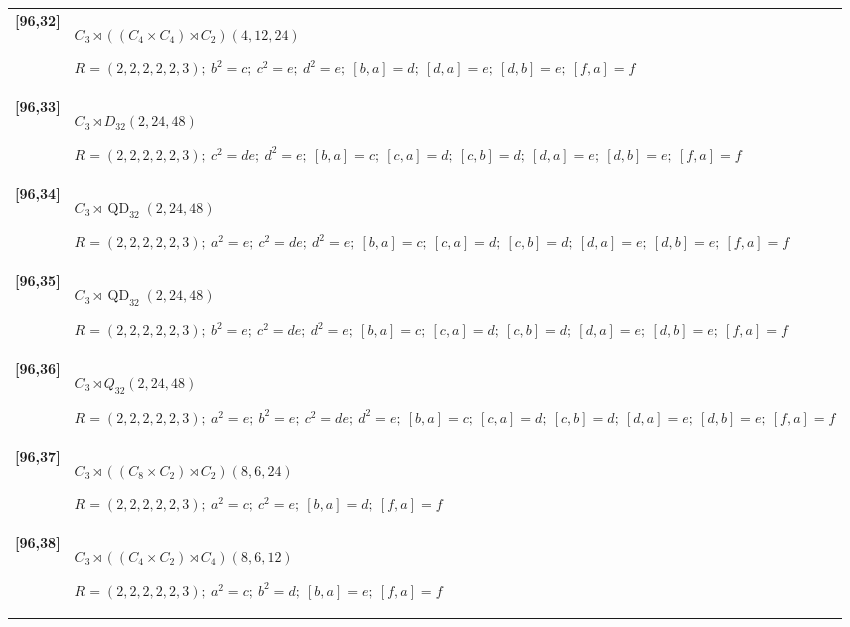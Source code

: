 \documentclass[UTF8,fontset=fandol,11pt,a4paper]{ctexart}
\begin{document}
\begin{longtable}{@{}p{17mm}>{\raggedright\arraybackslash}p{141mm}@{}}
\textbf{[96,32]} & $C_{3}\rtimes ((C_{4}\times C_{4})\rtimes C_{2})$\quad $(4,12,24)$\par\(R=(2,2,2,2,2,3);\allowbreak\ b^{2}=c;\allowbreak\ c^{2}=e;\allowbreak\ d^{2}=e;\allowbreak\ [b,a]=d;\allowbreak\ [d,a]=e;\allowbreak\ [d,b]=e;\allowbreak\ [f,a]=f\)\\[3pt]

\textbf{[96,33]} & $C_{3}\rtimes D_{32}$\quad $(2,24,48)$\par\(R=(2,2,2,2,2,3);\allowbreak\ c^{2}=de;\allowbreak\ d^{2}=e;\allowbreak\ [b,a]=c;\allowbreak\ [c,a]=d;\allowbreak\ [c,b]=d;\allowbreak\ [d,a]=e;\allowbreak\ [d,b]=e;\allowbreak\ [f,a]=f\)\\[3pt]

\textbf{[96,34]} & $C_{3}\rtimes \operatorname{QD}_{32}$\quad $(2,24,48)$\par\(R=(2,2,2,2,2,3);\allowbreak\ a^{2}=e;\allowbreak\ c^{2}=de;\allowbreak\ d^{2}=e;\allowbreak\ [b,a]=c;\allowbreak\ [c,a]=d;\allowbreak\ [c,b]=d;\allowbreak\ [d,a]=e;\allowbreak\ [d,b]=e;\allowbreak\ [f,a]=f\)\\[3pt]

\textbf{[96,35]} & $C_{3}\rtimes \operatorname{QD}_{32}$\quad $(2,24,48)$\par\(R=(2,2,2,2,2,3);\allowbreak\ b^{2}=e;\allowbreak\ c^{2}=de;\allowbreak\ d^{2}=e;\allowbreak\ [b,a]=c;\allowbreak\ [c,a]=d;\allowbreak\ [c,b]=d;\allowbreak\ [d,a]=e;\allowbreak\ [d,b]=e;\allowbreak\ [f,a]=f\)\\[3pt]

\textbf{[96,36]} & $C_{3}\rtimes Q_{32}$\quad $(2,24,48)$\par\(R=(2,2,2,2,2,3);\allowbreak\ a^{2}=e;\allowbreak\ b^{2}=e;\allowbreak\ c^{2}=de;\allowbreak\ d^{2}=e;\allowbreak\ [b,a]=c;\allowbreak\ [c,a]=d;\allowbreak\ [c,b]=d;\allowbreak\ [d,a]=e;\allowbreak\ [d,b]=e;\allowbreak\ [f,a]=f\)\\[3pt]

\textbf{[96,37]} & $C_{3}\rtimes ((C_{8}\times C_{2})\rtimes C_{2})$\quad $(8,6,24)$\par\(R=(2,2,2,2,2,3);\allowbreak\ a^{2}=c;\allowbreak\ c^{2}=e;\allowbreak\ [b,a]=d;\allowbreak\ [f,a]=f\)\\[3pt]

\textbf{[96,38]} & $C_{3}\rtimes ((C_{4}\times C_{2})\rtimes C_{4})$\quad $(8,6,12)$\par\(R=(2,2,2,2,2,3);\allowbreak\ a^{2}=c;\allowbreak\ b^{2}=d;\allowbreak\ [b,a]=e;\allowbreak\ [f,a]=f\)\\[3pt]


\end{longtable}
\end{document}
